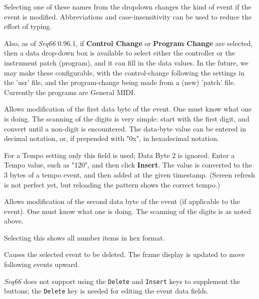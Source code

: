 
   Selecting one of these names from the dropdown changes the kind of event if
   the event is modified.  Abbreviations and case-insensitivity can be used to
   reduce the effort of typing.

   Also, as of \textsl{Seq66} 0.96.1, if \textbf{Control Change} or
   \textbf{Program Change} are selected, then a data drop-down box is available
   to select either the controller or
   the instrument patch (program), and it can fill in the data values.
   In the future, we may make these configurable, with the control-change
   following the settings in the 'usr' file, and the program-change being made
   from a (new) 'patch' file. Currently the programs are General MIDI.

   Allows modification of the first data byte of the event.
   One must know what one is doing.
   The scanning of the digits is very simple:  start with the first digit, and
   convert until a non-digit is encountered.  The data-byte value can be
   entered in decimal notation, or, if prepended with "0x", in hexadecimal
   notation.

   For a Tempo setting only this field is used; Data Byte 2 is ignored.
   Enter a Tempo value, such as "120", and then click \textbf{Insert}. The
   value is converted to the 3 bytes of a tempo event, and then
   added at the given timestamp.  (Screen refresh is not perfect yet, but
   reloading the pattern shows the correct tempo.)

   Allows modification of the second data byte of the event (if applicable
   to the event).
   One must know what one is doing.
   The scanning of the digits is as noted above.

   Selecting this shows all number items in hex format.

   Causes the selected event to be deleted.
   The frame display is updated to move following events upward.

   \textsl{Seq66} does not support using the
   \texttt{Delete} and \texttt{Insert} keys to
   supplement the buttons; the \texttt{Delete}
   key is needed for editing the event data fields.

